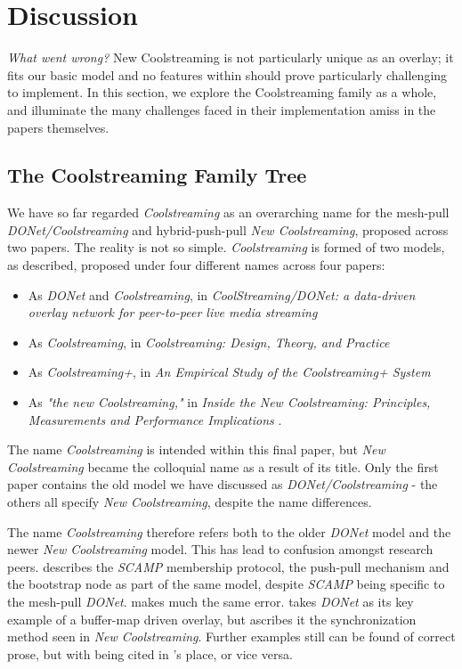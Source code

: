\documentclass[12pt,a4paper]{article}
\begin{document}
\section{Discussion} \label{problems}
\textit{What went wrong?} New Coolstreaming is not particularly unique as an overlay; it fits our basic model and no features within should prove particularly challenging to implement. In this section, we explore the Coolstreaming family as a whole, and illuminate the many challenges faced in their implementation amiss in the papers themselves.

\subsection{The Coolstreaming Family Tree} \label{problems:familytree}
We have so far regarded \textit{Coolstreaming} as an overarching name for the mesh-pull \textit{DONet/Coolstreaming} and hybrid-push-pull \textit{New Coolstreaming}, proposed across two papers. The reality is not so simple. \textit{Coolstreaming} is formed of two models, as described, proposed under four different names across four papers:

\begin{itemize}
	\item As \textit{DONet} and \textit{Coolstreaming}, in \textit{CoolStreaming/DONet: a data-driven overlay network for peer-to-peer live media streaming} \cite{Zhang2005}
	\item As \textit{Coolstreaming}, in \textit{Coolstreaming: Design, Theory, and Practice} \cite{Xie2007}
	\item As \textit{Coolstreaming+}, in \textit{An Empirical Study of the Coolstreaming+ System} \cite{Li2007}
	\item As \textit{"the new Coolstreaming,"} in \textit{Inside the New Coolstreaming: Principles, Measurements and Performance Implications} \cite{Li2008}.
\end{itemize}

The name \textit{Coolstreaming} is intended within this final paper, but \textit{New Coolstreaming} became the colloquial name as a result of its title. Only the first paper contains the old model we have discussed as \textit{DONet/Coolstreaming} - the others all specify \textit{New Coolstreaming}, despite the name differences.

The name \textit{Coolstreaming} therefore refers both to the older \textit{DONet} model and the newer \textit{New Coolstreaming} model. This has lead to confusion amongst research peers. \cite{Kondo2014} describes the \textit{SCAMP} membership protocol, the push-pull mechanism and the bootstrap node as part of the same model, despite \textit{SCAMP} being specific to the mesh-pull \textit{DONet}. \cite{Beraldi2010} makes much the same error. \cite{Lan2011} takes \textit{DONet} as its key example of a buffer-map driven overlay, but ascribes it the synchronization method seen in \textit{New Coolstreaming}. Further examples still can be found of correct prose, but with \cite{Xie2007} being cited in \cite{Zhang2005}'s place, or vice versa.
\end{document}
